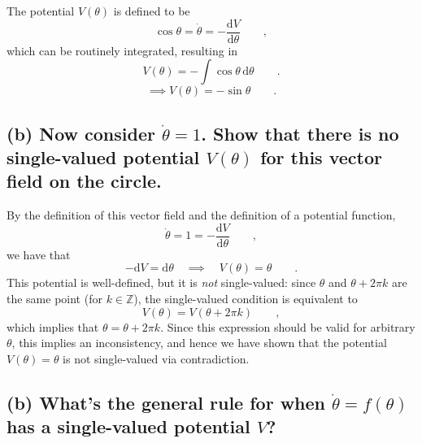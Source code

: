 \documentclass[draft]{agujournal2019}
\begin{document}
The potential $V(\theta)$ is defined to be 
\begin{equation*}
    \cos{\theta} = \dot \theta = -\frac{\mathrm{d}V}{\mathrm{d}\theta} \qquad ,
\end{equation*}
which can be routinely integrated, resulting in
\begin{equation*}
    V(\theta) = -\int \cos{\theta} \,\mathrm{d}\theta \qquad .
\end{equation*}
\begin{equation*}
    \implies V(\theta) = -\sin{\theta} \qquad .
\end{equation*}


\subsection{(b) Now consider $\dot \theta = 1$. Show that there is no single-valued potential $V(\theta)$ for this vector field on the circle. }
\label{ssec:p3b}

By the definition of this vector field and the definition of a potential function, 
\begin{equation*}
    \dot \theta = 1 = - \frac{\mathrm{d}V}{\mathrm{d}\theta} \qquad ,
\end{equation*}
we have that
\begin{equation*}
    -\mathrm{d}V = \mathrm{d}\theta \quad \implies \quad V(\theta)=\theta \qquad .
\end{equation*}
This potential is well-defined, but it is \emph{not} single-valued: since $\theta$ and $\theta+2\pi k $ are the same point (for $k\in\mathbb{Z}$), the single-valued condition is equivalent to 
\begin{equation}
    \label{eqn:p3_V_period}
    V(\theta)=V(\theta+2\pi k) \qquad ,
\end{equation}
which implies that $\theta = \theta + 2 \pi k$. Since this expression should be valid for arbitrary $\theta$, this implies an inconsistency, and hence we have shown that the potential $V(\theta)=\theta$ is not single-valued via contradiction. 
\par





\subsection{(b) What's the general rule for when $\dot \theta = f(\theta)$ has a single-valued potential $V$? }
\label{ssec:p3c}
\end{document}
